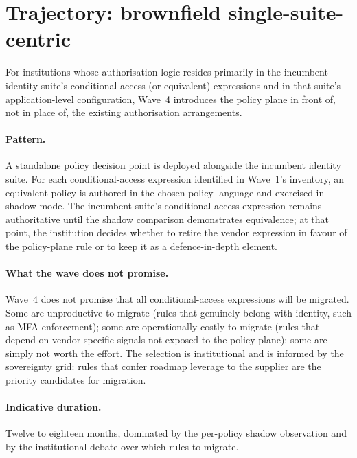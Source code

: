 \section{Trajectory: brownfield single-suite-centric}
\label{sec:w4-brownfield-ms}

For institutions whose authorisation logic resides primarily in
the incumbent identity suite's conditional-access (or equivalent)
expressions and in that suite's application-level configuration,
Wave~4 introduces the policy plane in front of, not in place of,
the existing authorisation arrangements.

\paragraph{Pattern.} A standalone policy decision point is
deployed alongside the incumbent identity suite. For each
conditional-access expression identified in Wave~1's inventory, an
equivalent policy is authored in the chosen policy language and
exercised in shadow mode. The incumbent suite's conditional-access
expression remains authoritative until the shadow comparison
demonstrates equivalence; at that point, the institution decides
whether to retire the vendor expression in favour of the
policy-plane rule or to keep it as a defence-in-depth element.

\paragraph{What the wave does not promise.} Wave~4 does not
promise that all conditional-access expressions will be migrated.
Some are unproductive to migrate (rules that genuinely belong with
identity, such as MFA enforcement); some are operationally costly
to migrate (rules that depend on vendor-specific signals not
exposed to the policy plane); some are simply not worth the
effort. The selection is institutional and is informed by the
sovereignty grid: rules that confer roadmap leverage to the
supplier are the priority candidates for migration.

\paragraph{Indicative duration.} Twelve to eighteen months,
dominated by the per-policy shadow observation and by the
institutional debate over which rules to migrate.

